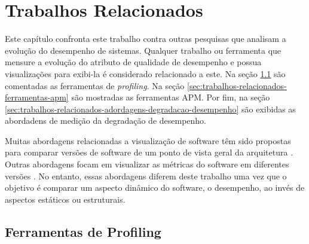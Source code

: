 \chapter{Trabalhos Relacionados} \label{ch:trabalhos-relacionados}

Este capítulo confronta este trabalho contra outras pesquisas que analisam a evolução do desempenho de sistemas. Qualquer trabalho ou ferramenta que mensure a evolução do atributo de qualidade de desempenho e possua visualizações para exibi-la é considerado relacionado a este. Na seção \ref{sec:trabalhos-relacionados-ferramentas-profiling} são comentadas as ferramentas de \textit{profiling}. Na seção \ref{sec:trabalhos-relacionados-ferramentas-apm} são mostradas as ferramentas APM. Por fim, na seção \ref{sec:trabalhos-relacionados-adordagens-degradacao-desempenho} são exibidas as abordadens de medição da degradação de desempenho.

Muitas abordagens relacionadas a visualização de software têm sido propostas para comparar versões de software de um ponto de vista geral da arquitetura \cite{Steinbruckner2010b}\cite{Telea2008}\cite{Collberg2003}\cite{Eick1992}\cite{Holten2008}. Outras abordagens focam em visualizar as métricas do software em diferentes versões \cite{Langelier2008}\cite{Lanza2001}\cite{Pinzger2005}\cite{Wettel2008}. No entanto, essas abordagens diferem deste trabalho uma vez que o objetivo é comparar um aspecto dinâmico do software, o desempenho, ao invés de aspectos estáticos ou estruturais.

\section{Ferramentas de Profiling} \label{sec:trabalhos-relacionados-ferramentas-profiling}

